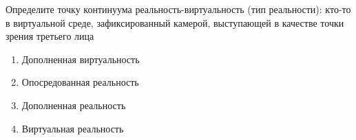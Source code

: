 
Определите точку континуума реальность-виртуальность (тип реальности): кто-то в виртуальной среде, зафиксированный камерой, выступающей в качестве точки зрения третьего лица

\begin{enumerate}
    \item Дополненная виртуальность
    \item Опосредованная реальность
    \item Дополненная реальность
    \item Виртуальная реальность
\end{enumerate}

